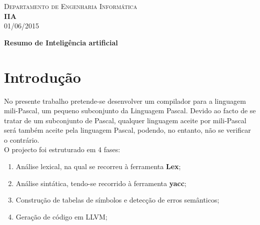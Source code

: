 \documentclass[12pt]{article}
\author{}
\date{}
\begin{document}
\begin{titlepage}
\begin{center}
\textsc{\LARGE Departamento de Engenharia Informática}\\[1.5cm]
\sepline
{ \huge \bfseries IIA}\\[0.4cm]
\textsc{\LARGE 01/06/2015}
\sepline

{\huge \bfseries Resumo de Inteligência artificial}\\[0.4cm]


\sepline
{}


\sepline

\end{center}
\end{titlepage}

\newpage

\pagestyle{fancy}
\fancyhf{}




\tableofcontents
\newpage


\section{Introdução}

\setlength{\parindent}{1cm} No presente trabalho pretende-se desenvolver um compilador para a linguagem mili-Pascal, um pequeno subconjunto da Linguagem Pascal. Devido ao facto de se tratar de um subconjunto de Pascal, qualquer linguagem aceite por mili-Pascal será também aceite pela linguagem Pascal, podendo, no entanto, não se verificar o contrário.\\
\indent O projecto foi estruturado em 4 fases:
\begin{enumerate}

\item Análise lexical, na qual se recorreu à ferramenta \textbf{Lex};
\item Análise sintática, tendo-se recorrido à ferramenta \textbf{yacc};
\item Construção de tabelas de símbolos e detecção de erros semânticos;
\item Geração de código em LLVM;

\end{enumerate}
\end{document}
